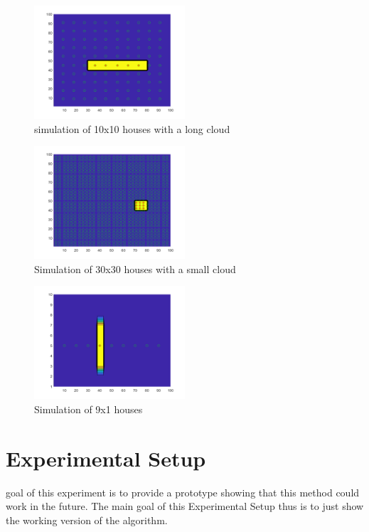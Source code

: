 \documentclass[a4paper,journal]{DDREAM}
\begin{document}
\begin{figure}[H]
\centering
    \includegraphics[width=0.5\textwidth]{./resources/10x10-large.png}
    \caption{simulation of 10x10 houses with a long cloud}
    \label{fig:sim-10}
\end{figure}

\begin{figure}[H]
\centering
    \includegraphics[width=0.5\textwidth]{./resources/30x30.png}
    \caption{Simulation of 30x30 houses with a small cloud}
    \label{fig:sim-30}
\end{figure}

\begin{figure}[H]
\centering
    \includegraphics[width=0.5\textwidth]{./resources/9x1.png}
    \caption{Simulation of 9x1 houses}
    \label{fig:sim-9}
\end{figure}

\section{Experimental Setup}\label{sec:experiment}
 goal of this experiment is to provide a prototype showing that this method could work in the future.
The main goal of this Experimental Setup thus is to just show the working version of the algorithm.
\end{document}

